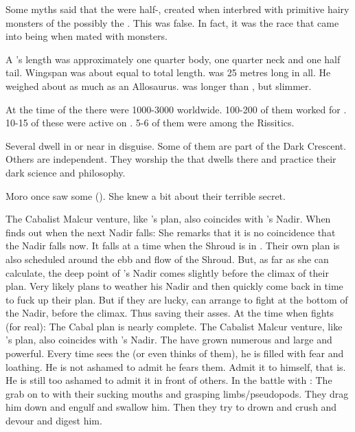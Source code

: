 Some myths said that the \nephilim were half-\humans, created when \humans interbred with primitive hairy monsters of the \wylde\dash{}possibly the \gnomphilim. 
This was false. 
In fact, it was the \human race that came into being when \nephilim mated with monsters.


A \dragon's length was approximately one quarter body, one quarter neck and one half tail.
Wingspan was about equal to total length.
\Ishnaruchaefir was 25 metres long in all. He weighed about as much as an Allosaurus. 
\Secherdamon was longer than \Ishnaruchaefir, but slimmer. 


At the time of the \thirdbanewar there were 1000-3000 \quiljaaran worldwide. 
100-200 of them worked for \Secherdamon.
10-15 of these were active on \Azmith.
5-6 of them were among the Rissitics. 

Several \quiljaaran dwell in or near \Yormis in disguise. 
Some of them are part of the Dark Crescent.
Others are independent.
They worship the \xs that dwells there and practice their dark science and philosophy. 

Moro \Cornel once saw some \quiljaaran (). 
She knew a bit about their terrible secret. 


The Cabalist Malcur venture, like \Secherdamon's plan, also coincides with \Ishnaruchaefir's Nadir. 
When \Urizeth finds out when the next Nadir falls:
  She remarks that it is no coincidence that the Nadir falls now.
  It falls at a time when the Shroud is in . 
  Their own plan is also scheduled around the ebb and flow of the Shroud.
  But, as far as she can calculate, the deep point of \Ishnaruchaefir's Nadir comes slightly before the climax of their plan. 
  Very likely \Ishnaruchaefir plans to weather his Nadir and then quickly come back in time to fuck up their plan.
  But if they are lucky, \Teshrial can arrange to fight \Ishnaruchaefir at the bottom of the Nadir, before the climax.
  Thus saving their asses.
At the time when \Teshrial fights \Ishnaruchaefir (for real):
  The Cabal plan is nearly complete. 
  The Cabalist Malcur venture, like \Secherdamon's plan, also coincides with \Ishnaruchaefir's Nadir. 
  The \noggyaleth have grown numerous and large and powerful.
Every time \Teshrial sees the \noggyaleth (or even thinks of them), he is filled with fear and loathing. 
He is not ashamed to admit he fears them. 
Admit it to himself, that is.
He is still too ashamed to admit it in front of others.
In the battle with \Ishnaruchaefir:
  The \noggyaleth grab on to \Ishnaruchaefir with their sucking mouths and grasping limbs/pseudopods.
  They drag him down and engulf and swallow him.
  Then they try to drown and crush and devour and digest him.

